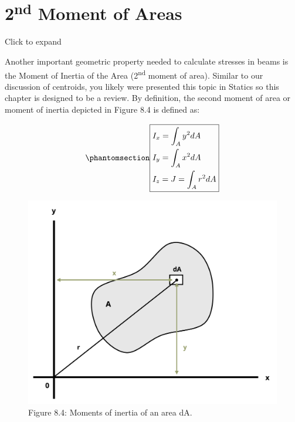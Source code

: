 \documentclass[
  letterpaper,
  DIV=11,
  numbers=noendperiod]{scrreprt}
\theoremstyle{definition}
\theoremstyle{remark}
\begin{document}
\section{\texorpdfstring{2\textsuperscript{nd} Moment of
Areas}{2nd Moment of Areas}}\label{sec-8.2}

Click to expand

Another important geometric property needed to calculate stresses in
beams is the Moment of Inertia of the Area (2\textsuperscript{nd} moment
of area). Similar to our discussion of centroids, you likely were
presented this topic in Statics so this chapter is designed to be a
review. By definition, the second moment of area or moment of inertia
depicted in Figure 8.4 is defined as:

\begin{equation}\phantomsection\label{eq-8.2}{
\boxed{\begin{aligned}
&I_x=\int_A y^2 d A \\
&I_y=\int_A x^2 d A \\
&I_z=J=\int_A r^2 d A \\
\end{aligned}}
}\end{equation}

\begin{figure}[H]

{\centering \includegraphics[width=4.57292in,height=\textheight]{images/CH 8 PNGs/figure 8.4.png}

}

\caption{Figure 8.4: Moments of inertia of an area dA.}

\end{figure}%
\end{document}
